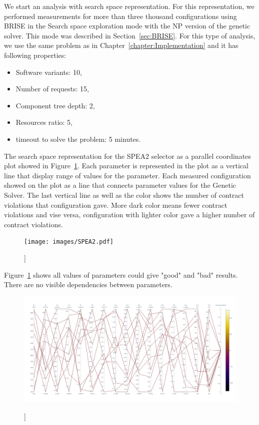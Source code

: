 We start an analysis with search space representation. For this representation, we performed measurements for more than three thousand configurations using BRISE in the Search space exploration mode with the NP version of the genetic solver. This mode was described in Section~\ref{sec:BRISE}. For this type of analysis, we use the same problem as in Chapter~\ref{chapter:Implementation} and it has following properties:
\begin{itemize}
	\item Software variants: 10,
	\item Number of requests: 15,
	\item Component tree depth: 2,
	\item Resources ratio: 5,
	\item timeout to solve the problem: 5 minutes.
\end{itemize}

The search space representation for the SPEA2 selector as a parallel coordinates plot showed in Figure~\ref{fig:SearchSpaceViewFull}.
Each parameter is represented in the plot as a vertical line that display range of values for the parameter. Each measured configuration showed on the plot as a line that connects parameter values for the Genetic Solver. The last vertical line as well as the color shows the number of contract violations that configuration gave. More dark color means fewer contract violations and vise versa, configuration with lighter color gave a higher number of contract violations.

\begin{figure}
	\centering
	\texttt{[image: images/SPEA2.pdf]}
	\caption[]]{}
	\label{fig:SearchSpaceViewFull}
\end{figure}

Figure~\ref{fig:SearchSpaceViewFull} shows all values of parameters could give "good" and "bad" results. There are no visible dependencies between parameters. 

\begin{figure}
	\centering
	\includegraphics[width=\textwidth]{images/SPEA2_Zero_validity.html.pdf}
	\caption[]]{}
	\label{fig:SearchSpaceValid}
\end{figure}

